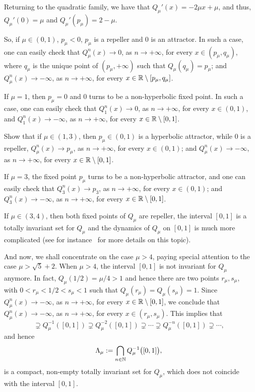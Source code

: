 Returning to the quadratic family, we have that $Q_\mu'(x)=-2\mu x + \mu$, and thus, $Q_\mu'(0)=\mu$ and $Q_\mu'(p_\mu)=2-\mu$.

So, if $\mu\in (0,1)$, $p_\mu<0$, $p_\mu$ is a repeller and $0$ is an attractor. In such a case, one can easily check that $Q_\mu^n(x)\to 0$, as $n\to+\infty$, for every $x\in (p_\mu,q_\mu)$, where $q_\mu$ is the unique point of $(p_\mu,+\infty)$ such that $Q_\mu(q_\mu)=p_\mu$; and $Q_\mu^n(x)\to-\infty$, as $n\to+\infty$, for every $x\in\mathbb{R}\setminus[p_\mu,q_\mu]$.

If $\mu=1$, then $p_\mu=0$ and $0$ turns to be a non-hyperbolic fixed point. In such a case, one can easily check that $Q_1^n(x)\to 0$, as $n\to+\infty$, for every $x\in(0,1)$, and $Q_1^n(x)\to-\infty$, as $n\to+\infty$, for every $x\in\mathbb{R}\setminus[0,1]$.

\begin{exercise}
  Show that if $\mu\in(1,3)$, then $p_\mu\in(0,1)$ is a hyperbolic attractor, while $0$ is a repeller, $Q_\mu^n(x)\to p_\mu$, as $n\to+\infty$, for every $x\in(0,1)$; and $Q_\mu^n(x)\to-\infty$, as $n\to+\infty$, for every $x\in\mathbb{R}\setminus[0,1]$.
\end{exercise}

If $\mu=3$, the fixed point $p_\mu$ turns to be a non-hyperbolic attractor, and one can easily check that $Q_3^n(x)\to p_3$, as $n\to+\infty$, for every $x\in(0,1)$; and $Q_3^n(x)\to-\infty$, as $n\to+\infty$, for every $x\in\mathbb{R}\setminus[0,1]$.

If $\mu\in(3,4)$, then both fixed points of $Q_\mu$ are repeller, the interval $[0,1]$ is a totally invariant set for $Q_\mu$ and the dynamics of $Q_\mu$ on $[0,1]$ is much more complicated (see for instance~\cite{DevaneyIntroChaoticDynSys} for more details on this topic).

And now, we shall concentrate on the case $\mu>4$, paying special attention to the case $\mu>\sqrt{5}+2$. When $\mu>4$, the interval $[0,1]$ is not invariant for $Q_\mu$ anymore. In fact, $Q_\mu(1/2)=\mu/4>1$ and hence there are two points $r_\mu, s_\mu$, with  $0<r_\mu<1/2<s_\mu<1$ such that $Q_\mu(r_\mu)=Q_\mu(s_\mu)=1$. Since $Q_\mu^n(x)\to-\infty$, as $n\to+\infty$, for every $x\in\mathbb{R}\setminus[0,1]$, we conclude that $Q_\mu^n(x)\to-\infty$, as $n\to+\infty$, for every $x\in (r_\mu,s_\mu)$. This implies that
\begin{displaymath}
  [0,1]\supsetneq Q_\mu^{-1}([0,1])\supsetneq Q_\mu^{-2}([0,1])\supsetneq\cdots\supsetneq Q_\mu^{-n}([0,1])\supsetneq\cdots,
\end{displaymath}
and hence
\begin{equation}
  \label{eq:Lambda-mu-invariant-set-Q-mu}
  \Lambda_\mu:=\bigcap_{n\in\mathbb{N}} Q_\mu^{-1}\big([0,1]\big),
\end{equation}
is a compact, non-empty totally invariant set for $Q_\mu$, which does not coincide with the interval $[0,1]$.

